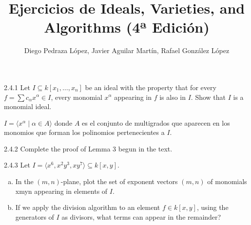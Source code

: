 \documentclass[twoside]{article}
\begin{document}
\title{Ejercicios de Ideals, Varieties, and Algorithms (4ª Edición)}
\author{Diego Pedraza López, Javier Aguilar Martín, Rafael González López}
\maketitle

\begin{ejercicio}{2.4.1}
Let $I ⊆ k[x_1,\dots , x_n]$ be an ideal with the property that for every $f =\sum
c_{α} x^{α} ∈ I$, every
monomial $x^α$ appearing in $f$ is also in $I$. Show that $I$ is a monomial ideal.
\end{ejercicio}
\begin{solucion}
$I=\langle x^\alpha\mid\alpha\in A\rangle$ donde $A$ es el conjunto de multigrados que aparecen en los monomios que forman los polinomios pertenecientes a $I$. 
\end{solucion}
\newpage

\begin{ejercicio}{2.4.2}
Complete the proof of Lemma 3 begun in the text.
\end{ejercicio}
\begin{solucion}
\end{solucion}
\newpage

\begin{ejercicio}{2.4.3}
Let $I = \langle
x^6, x^2y^3, xy^7\rangle ⊆ k[x, y]$.
\begin{enumerate}[a.]
\item In the $(m, n)$-plane, plot the set of exponent vectors $(m, n)$ of monomials xmyn appearing
in elements of $I$.
\item If we apply the division algorithm to an element $f ∈ k[x, y]$, using the generators of $I$
as divisors, what terms can appear in the remainder?
\end{enumerate}
\end{ejercicio}
\begin{solucion}
\end{solucion}

\newpage
\end{document}
